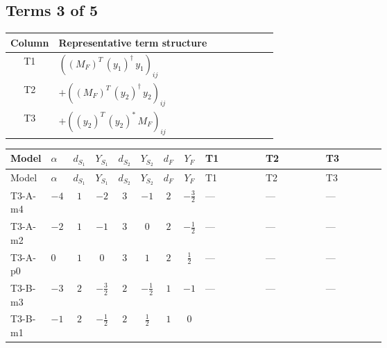 \documentclass[8pt]{article}
\begin{document}
\begin{landscape}
\subsection*{Terms 3 of 5}
\begin{center}
\begin{tabular}{@{}c >{\raggedright\arraybackslash}p{0.82\linewidth}@{}}
\toprule
Column & Representative term structure \\
\midrule
T1 & \(\displaystyle \left(\left({M_F}\right)^{T}\,\left({y_1}\right)^{\dagger}\,{y_1}\right)_{ij}\) \\
\midrule
T2 & \(\displaystyle +\left(\left({M_F}\right)^{T}\,\left({y_2}\right)^{\dagger}\,{y_2}\right)_{ij}\) \\
\midrule
T3 & \(\displaystyle +\left(\left({y_2}\right)^{T}\,\left({y_2}\right)^{*}\,{M_F}\right)_{ij}\) \\
\midrule
\bottomrule
\end{tabular}
\end{center}
\smallskip
\tiny
\begin{longtable}{@{}llcccccc >{\raggedright\arraybackslash}p{0.21\linewidth} >{\raggedright\arraybackslash}p{0.21\linewidth} >{\raggedright\arraybackslash}p{0.21\linewidth}@{}}
\toprule
Model & $\alpha$ & $d_{S_1}$ & $Y_{S_1}$ & $d_{S_2}$ & $Y_{S_2}$ & $d_F$ & $Y_F$ & T1 & T2 & T3 \\
\midrule
\endfirsthead
\toprule
Model & $\alpha$ & $d_{S_1}$ & $Y_{S_1}$ & $d_{S_2}$ & $Y_{S_2}$ & $d_F$ & $Y_F$ & T1 & T2 & T3 \\
\midrule
\endhead
T3-A-m4 & $-4$ & $1$ & $-2$ & $3$ & $-1$ & $2$ & $-\frac{3}{2}$ & --- & --- & --- \\
\midrule
T3-A-m2 & $-2$ & $1$ & $-1$ & $3$ & $0$ & $2$ & $-\frac{1}{2}$ & --- & --- & --- \\
\midrule
T3-A-p0 & $0$ & $1$ & $0$ & $3$ & $1$ & $2$ & $\frac{1}{2}$ & --- & --- & --- \\
\midrule
T3-B-m3 & $-3$ & $2$ & $-\frac{3}{2}$ & $2$ & $-\frac{1}{2}$ & $1$ & $-1$ & --- & --- & --- \\
\midrule
T3-B-m1 & $-1$ & $2$ & $-\frac{1}{2}$ & $2$ & $\frac{1}{2}$ & $1$ & $0$ & \scriptsize\adjustbox{max width=\linewidth}{$\begin{gathered} \left(\left({M_F}\right)^{T}\,\left({y_1}\right)^{\dagger}\,{y_1}\right)_{ij}\end{gathered}$} & \scriptsize\adjustbox{max width=\linewidth}{$\begin{gathered} +\left(\left({M_F}\right)^{T}\,\left({y_2}\right)^{\dagger}\,{y_2}\right)_{ij}\end{gathered}$} & \scriptsize\adjustbox{max width=\linewidth}{$\begin{gathered} +\left(\left({y_2}\right)^{T}\,\left({y_2}\right)^{*}\,{M_F}\right)_{ij}\end{gathered}$} \\

\end{longtable}
\end{landscape}
\end{document}
